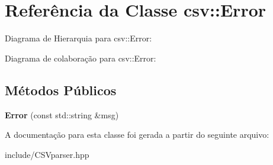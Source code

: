 \hypertarget{classcsv_1_1Error}{}\section{Referência da Classe csv\+:\+:Error}
\label{classcsv_1_1Error}


Diagrama de Hierarquia para csv\+:\+:Error\+:


Diagrama de colaboração para csv\+:\+:Error\+:
\subsection*{Métodos Públicos}
\begin{DoxyCompactItemize}
\item 
\mbox{\label{classcsv_1_1Error_afebdc6f80497e8701658c76d6c719463}} 
{\bfseries Error} (const std\+::string \&msg)
\end{DoxyCompactItemize}


A documentação para esta classe foi gerada a partir do seguinte arquivo\+:\begin{DoxyCompactItemize}
\item 
include/C\+S\+Vparser.\+hpp\end{DoxyCompactItemize}
